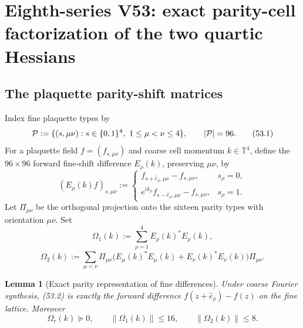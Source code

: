 \documentclass[11pt,oneside]{book}
\newtheorem{lemma}[theorem]{Lemma}
\theoremstyle{definition}
\theoremstyle{remark}
\begin{document}


\section{Eighth-series V53: exact parity-cell factorization of the
two quartic Hessians}
\label{sec:e8v53}

\subsection{The plaquette parity-shift matrices}

Index fine plaquette types by
\[
 {\cal P}:=\{(s,\mu\nu):
 s\in\{0,1\}^4,\ 1\le\mu<\nu\le4\},\qquad |{\cal P}|=96.      \tag{53.1}
\]
For a plaquette field \(f=(f_{s,\mu\nu})\) and coarse cell
momentum \(k\in{\mathbb T}^4\), define the \(96\times96\) forward
fine-shift difference \(E_\rho(k)\), preserving \(\mu\nu\), by
\[
 (E_\rho(k)f)_{s,\mu\nu}
 :=\begin{cases}
 f_{s+\widehat e_\rho,\mu\nu}-f_{s,\mu\nu},
 &s_\rho=0,\\
 e^{ik_\rho}f_{s-\widehat e_\rho,\mu\nu}-f_{s,\mu\nu},
 &s_\rho=1.
 \end{cases}                                                   \tag{53.2}
\]
Let \(\Pi_{\mu\nu}\) be the orthogonal projection onto the sixteen
parity types with orientation \(\mu\nu\).  Set
\[
 \Omega_1(k):=\sum_{\rho=1}^4E_\rho(k)^*E_\rho(k),             \tag{53.3}
\]
\[
 \Omega_2(k):=\sum_{\mu<\nu}\Pi_{\mu\nu}
 \bigl(E_\mu(k)^*E_\mu(k)+E_\nu(k)^*E_\nu(k)\bigr)
 \Pi_{\mu\nu}.                                                \tag{53.4}
\]

\begin{lemma}[Exact parity representation of fine differences]
\label{lem:e8v53-parity-shift}
Under coarse Fourier synthesis, (53.2) is exactly the forward
difference \(f(z+\widehat e_\rho)-f(z)\) on the fine lattice.
Moreover
\[
 \Omega_r(k)\succeq0,\qquad
 \|\Omega_1(k)\|\le16,\qquad
 \|\Omega_2(k)\|\le8.                                        \tag{53.5}
\]
\end{lemma}
\end{document}
